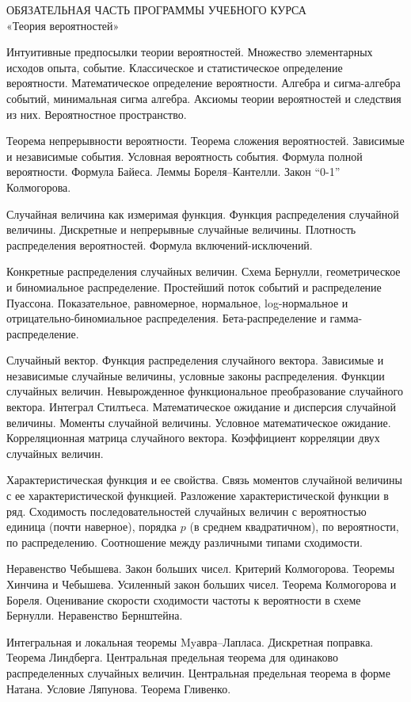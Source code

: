 \thispagestyle{empty} 
\begin{center}

{ОБЯЗАТЕЛЬНАЯ ЧАСТЬ ПРОГРАММЫ УЧЕБНОГО КУРСА  \\ 
«Теория вероятностей»  }
 
\end{center}
 
 {\small
 
Интуитивные предпосылки теории вероятностей. Множество элементарных исходов опыта, событие. Классическое и статистическое определение вероятности. Математическое определение вероятности. Алгебра и сигма-алгебра событий, минимальная сигма алгебра. Аксиомы теории вероятностей и следствия из них. Вероятностное пространство.

Теорема непрерывности вероятности. Теорема сложения вероятностей. Зависимые и независимые события. Условная вероятность события. Формула полной вероятности. Формула Байеса. Леммы Бореля--Кантелли. Закон ``0-1'' Колмогорова.

Случайная величина как измеримая функция. Функция распределения случайной величины. Дискретные и непрерывные случайные величины. Плотность распределения вероятностей. Формула включений-исключений.

Конкретные распределения случайных величин. Схема Бернулли, геометрическое и биномиальное распределение. Простейший поток событий и распределение Пуассона. Показательное, равномерное, нормальное, log-нормальное и отрицательно-биномиальное распределения. Бета-распределение и гамма-распределение.

Случайный вектор. Функция распределения случайного вектора. Зависимые и независимые случайные величины, условные законы распределения. Функции случайных величин. Невырожденное функциональное преобразование случайного вектора.
Интеграл Стилтьеса. Математическое ожидание и дисперсия случайной величины. Моменты случайной величины. Условное математическое ожидание. Корреляционная матрица случайного вектора. Коэффициент корреляции двух случайных величин.

Характеристическая функция и ее свойства. Связь моментов случайной величины с ее характеристической функцией. Разложение характеристической функции в ряд.
Сходимость последовательностей случайных величин с вероятностью единица (почти наверное), порядка $p$ (в среднем квадратичном), по вероятности, по распределению. Соотношение между различными типами сходимости. 

Неравенство Чебышева. Закон больших чисел. Критерий Колмогорова. Теоремы Хинчина и Чебышева.  Усиленный закон больших чисел. Теорема Колмогорова и Бореля. Оценивание скорости сходимости частоты к вероятности в схеме Бернулли. Неравенство Бернштейна. 

Интегральная и локальная теоремы Myавра--Лапласа. Дискретная поправка. Теорема Линдберга. Центральная предельная теорема для одинаково распределенных случайных величин. Центральная предельная теорема в форме Натана. Условие Ляпунова. Теорема Гливенко.
}


